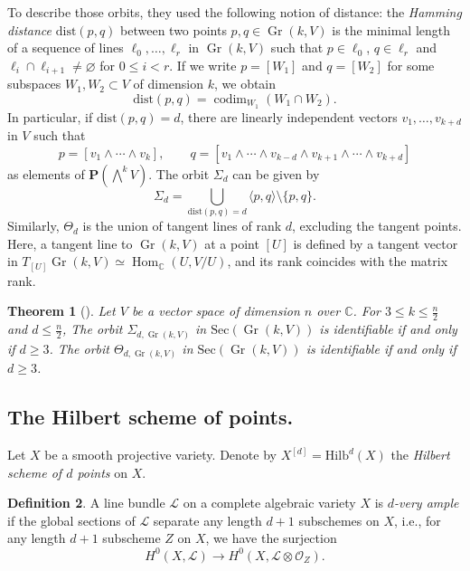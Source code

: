 \documentclass[a4paper]{amsart}
\numberwithin{equation}{section}
\theoremstyle{plain}
\newtheorem{thm}{Theorem}[section]
\theoremstyle{definition}
\newtheorem{defn}[thm]{Definition}
\theoremstyle{remark}
\numberwithin{figure}{section}
\numberwithin{table}{section}
\numberwithin{equation}{section}
\def \CC {\mathbb{C}}
\def \Lcal {\mathcal{L}}
\def \Ocal {\mathcal{O}}
\def \Pbf {\mathbf{P}}
\DeclareMathOperator{\codim}{codim}
\DeclareMathOperator{\Hom}{Hom}
\DeclareMathOperator{\Gr}{Gr}
\begin{document}
To describe those orbits, they used the following notion of distance:
the \textit{Hamming distance} $\mathrm{dist}(p,q)$ between two points $p,q \in \Gr(k,V)$ is the minimal length of a sequence of lines $\ell_0, \dots, \ell_r$ in $\Gr(k,V)$ such that $p \in \ell_0$, $q \in \ell_r$ and $\ell_i \cap \ell_{i+1} \neq \varnothing$ for $0 \leq i < r$.
If we write $p = [W_1]$ and $q = [W_2]$ for some subspaces $W_1,W_2 \subset V$ of dimension $k$, we obtain
 \[
  \mathrm{dist}(p,q) = \codim_{W_1} (W_1 \cap W_2).
 \]
In particular, if $\mathrm{dist}(p,q)=d$, there are linearly independent vectors $v_1, \dots, v_{k+d}$ in $V$ such that
 \[
  p = [v_1 \wedge \cdots \wedge v_k], \qquad q = [v_1 \wedge \cdots \wedge v_{k-d} \wedge v_{k+1} \wedge \cdots \wedge v_{k+d}]
 \]
as elements of $\Pbf(\bigwedge^{k} V)$.
The orbit $\Sigma_d$ can be given by
 \[
  \Sigma_d = \bigcup_{\mathrm{dist}(p,q) = d} \langle p,q \rangle \setminus \{ p,q \}.
 \]
Similarly, $\Theta_d$ is the union of tangent lines of rank $d$, excluding the tangent points.
Here, a tangent line to $\Gr(k,V)$ at a point $[U]$ is defined by a tangent vector in $T_{[U]}\Gr(k,V) \simeq \Hom_{\CC}(U, V/U)$, and its rank coincides with the matrix rank.


\begin{thm} [{\cite[Main~Result]{GS2022}}] \label{thm:identifiable-locus-for-Grassmannian}
    Let $V$ be a vector space of dimension $n$ over $\CC$.
    For $3 \leq k \leq \frac{n}{2}$ and $d \leq \frac{n}{2}$, The orbit $\Sigma_{d, \Gr(k,V)}$ in $\mathrm{Sec}(\Gr(k,V))$ is identifiable if and only if $d \geq 3$.
    The orbit $\Theta_{d, \Gr(k,V)}$ in $\mathrm{Sec}(\Gr(k,V))$ is identifiable if and only if $d \geq 3$.
\end{thm}


\subsection{The Hilbert scheme of points.} \label{subsec:Hilbert-scheme-of-points}
Let $X$ be a smooth projective variety.
Denote by $X^{[d]} = \mathrm{Hilb}^d(X)$ the \textit{Hilbert scheme of $d$ points} on $X$.

\begin{defn} \label{defn:d-very-ample}
    A line bundle $\Lcal$ on a complete algebraic variety $X$ is \textit{$d$-very ample} if the global sections of $\Lcal$ separate any length $d+1$ subschemes on $X$, i.e., for any length $d+1$ subscheme $Z$ on $X$, we have the surjection
     \[
      H^0(X,\Lcal) \rightarrow H^0(X, \Lcal \otimes \Ocal_Z).
     \]
\end{defn}
\end{document}

